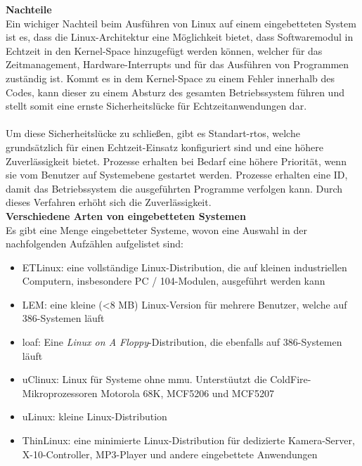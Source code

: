\textbf{Nachteile}\\

Ein wichiger Nachteil beim Ausführen von Linux auf einem eingebetteten System ist es, dass die Linux-Architektur eine Möglichkeit bietet, dass Softwaremodul in Echtzeit in den Kernel-Space hinzugefügt werden können, welcher für das Zeitmanagement, Hardware-Interrupts und
für das Ausführen von Programmen zuständig ist. Kommt es in dem Kernel-Space zu einem Fehler innerhalb des Codes, kann dieser zu einem Absturz des gesamten Betriebssystem führen und stellt somit eine ernste Sicherheitslücke für Echtzeitanwendungen dar.\\\\

Um diese Sicherheitslücke zu schließen, gibt es Standart-\ac{rtos}, welche grundsätzlich für einen Echtzeit-Einsatz konfiguriert sind und eine höhere Zuverlässigkeit bietet. Prozesse erhalten bei Bedarf eine höhere Priorität,
 wenn sie vom Benutzer auf Systemebene gestartet werden. Prozesse erhalten eine ID, damit das Betriebssystem die ausgeführten Programme verfolgen kann. Durch dieses Verfahren erhöht sich die Zuverlässigkeit.\\

 \textbf{Verschiedene Arten von eingebetteten Systemen}\\

 Es gibt eine Menge eingebetteter Systeme, wovon eine Auswahl in der nachfolgenden Aufzählen aufgelistet sind:\\
 \begin{itemize}
   \item ETLinux: eine vollständige Linux-Distribution, die auf kleinen industriellen Computern, insbesondere PC / 104-Modulen, ausgeführt werden kann
   \item LEM: eine kleine (<8 MB) Linux-Version für mehrere Benutzer, welche auf 386-Systemen läuft
   \item \ac{loaf}: Eine \emph{Linux on A Floppy}-Distribution, die ebenfalls auf 386-Systemen läuft
   \item uClinux: Linux für Systeme ohne \ac{mmu}. Unterstüutzt die ColdFire-Mikroprozessoren Motorola 68K, MCF5206 und MCF5207
   \item uLinux: kleine Linux-Distribution
   \item ThinLinux: eine minimierte Linux-Distribution für dedizierte Kamera-Server, X-10-Controller, MP3-Player und andere eingebettete Anwendungen
 \end{itemize}

